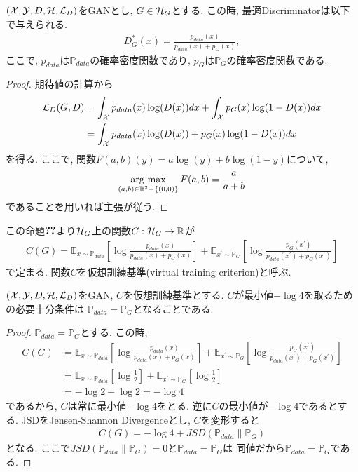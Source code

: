 \begin{Prop}\label{ODis}
    $(\mathcal{X}, \mathcal{Y}, D, \mathcal{H}, \mathcal{L}_{D})$をGANとし, $G\in\mathcal{H}_{G}$とする. この時, 最適Discriminatorは以下で与えられる.
    \begin{align*}
        D_{G}^{*}(x) = \frac{p_{data}(x)}{p_{data}(x) + p_{G}(x)},
    \end{align*}
    ここで, $p_{data}$は$\mathbb{P}_{data}$の確率密度関数であり, $p_{G}$は$\mathbb{P}_{G}$の確率密度関数である.
\begin{proof}
    期待値の計算から
    \begin{align*}
        \mathcal{L}_{D}(G, D) &= \int_{\mathcal{X}}p_{data}(x)\log(D(x))dx + \int_{\mathcal{X}}p_{G}(x)\log(1 - D(x))dx\\
                    &= \int_{\mathcal{X}}p_{data}(x)\log(D(x)) + p_{G}(x)\log(1 - D(x))dx
    \end{align*}
    を得る. ここで, 関数$F(a, b)(y) = a\log(y) + b\log(1 - y)$について, 
    \begin{align*}
        \mathop{\rm arg~max}\limits_{(a, b)\in\mathbb{R}^{2}- \{(0, 0)\}}F(a, b)= \frac{a}{a + b}
    \end{align*}
    であることを用いれば主張が従う.
\end{proof}
\end{Prop}
この命題$\Ref{ODis}$より$\mathcal{H}_{G}$上の関数$C:\mathcal{H}_{G}\to\mathbb{R}$が
\begin{align*}
    C(G) = \mathbb{E}_{x\sim\mathbb{P}_{data}}\left[ \log\frac{p_{data}(x)}{p_{data}(x) + p_{G}(x)} \right] + \mathbb{E}_{x^{\prime}\sim\mathbb{P}_{G}}\left[ \log\frac{p_{G}(x^{\prime})}{p_{data}(x^{\prime}) + p_{G}(x^{\prime})} \right]
\end{align*}
で定まる. 関数$C$を仮想訓練基準(virtual training criterion)と呼ぶ. 
\begin{Thm}
    $(\mathcal{X}, \mathcal{Y}, D, \mathcal{H}, \mathcal{L}_{D})$をGAN, $C$を仮想訓練基準とする. $C$が最小値$-\log4$を取るための必要十分条件は
    $\mathbb{P}_{data} = \mathbb{P}_{G}$となることである.
    \begin{proof}
        $\mathbb{P}_{data} = \mathbb{P}_{G}$とする. この時, 
        \begin{align*}
            C(G) &= \mathbb{E}_{x\sim\mathbb{P}_{data}}\left[ \log\frac{p_{data}(x)}{p_{data}(x) + p_{G}(x)} \right] + \mathbb{E}_{x^{\prime}\sim\mathbb{P}_{G}}\left[ \log\frac{p_{G}(x^{\prime})}{p_{data}(x^{\prime}) + p_{G}(x^{\prime})} \right]\\
                 &= \mathbb{E}_{x\sim\mathbb{P}_{data}}\left[ \log\frac{1}{2} \right] + \mathbb{E}_{x^{\prime}\sim\mathbb{P}_{G}}\left[ \log\frac{1}{2} \right]\\
                 &= -\log2 -\log2 = -\log4
        \end{align*}
        であるから, $C$は常に最小値$-\log4$をとる. 逆に$C$の最小値が$-\log4$であるとする. JSDをJensen-Shannon Divergenceとし, $C$を変形すると
        \begin{align*}
            C(G) = -\log4 + JSD\left(\mathbb{P}_{data}\|\mathbb{P}_{G}\right)
        \end{align*}
        となる. ここで$JSD\left(\mathbb{P}_{data}\|\mathbb{P}_{G}\right) = 0$と$\mathbb{P}_{data}=\mathbb{P}_{G}$は
        同値だから$\mathbb{P}_{data}=\mathbb{P}_{G}$である. 
    \end{proof}
\end{Thm}
